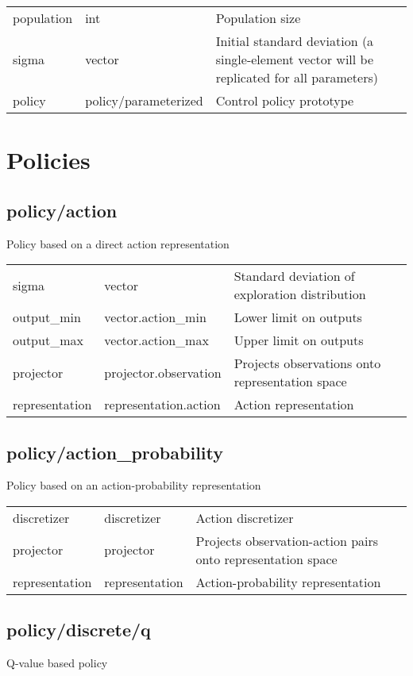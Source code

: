 \noindent\begin{tabular}{@{}lll@{}}
population&int&Population size\\
sigma&vector&Initial standard deviation (a single-element vector will be replicated for all parameters)\\
policy&policy/parameterized&Control policy prototype\\
\end{tabular}
\section{Policies}
\subsection{policy/action}
\noindent Policy based on a direct action representation\\

\noindent\begin{tabular}{@{}lll@{}}
sigma&vector&Standard deviation of exploration distribution\\
output\_min&vector.action\_min&Lower limit on outputs\\
output\_max&vector.action\_max&Upper limit on outputs\\
projector&projector.observation&Projects observations onto representation space\\
representation&representation.action&Action representation\\
\end{tabular}
\subsection{policy/action\_probability}
\noindent Policy based on an action-probability representation\\

\noindent\begin{tabular}{@{}lll@{}}
discretizer&discretizer&Action discretizer\\
projector&projector&Projects observation-action pairs onto representation space\\
representation&representation&Action-probability representation\\
\end{tabular}
\subsection{policy/discrete/q}
\noindent Q-value based policy\\

